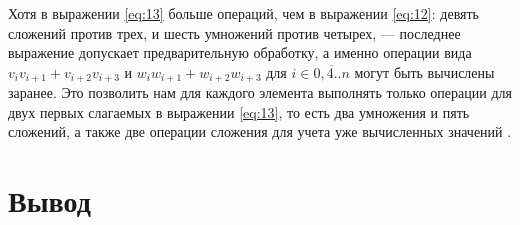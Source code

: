 Хотя в выражении \ref{eq:13} больше операций, чем в выражении \ref{eq:12}:
девять сложений против трех, и шесть умножений против четырех, --- последнее
выражение допускает предварительную обработку, а именно операции вида
$v_iv_{i+1}+v_{i+2}v_{i+3}$ и $w_iw_{i+1}+w_{i+2}w_{i+3}$ для $i \in
\overline{0,4..n}$ могут быть вычислены заранее. Это позволить нам для каждого
элемента выполнять только операции для двух первых слагаемых в выражении
\ref{eq:13}, то есть два умножения и пять сложений, а также две операции
сложения для учета уже вычисленных значений \cite{winograd} .

\section{Вывод}

